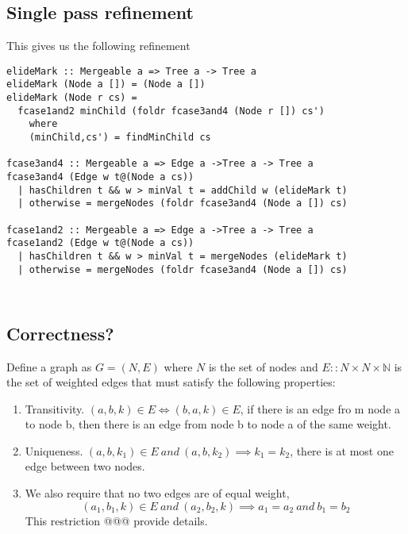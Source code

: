 \documentclass{jfp}
\begin{document}
\subsection{Single pass refinement}


This gives us the following refinement

\begin{verbatim}
elideMark :: Mergeable a => Tree a -> Tree a
elideMark (Node a []) = (Node a [])
elideMark (Node r cs) =
  fcase1and2 minChild (foldr fcase3and4 (Node r []) cs')
    where
    (minChild,cs') = findMinChild cs

fcase3and4 :: Mergeable a => Edge a ->Tree a -> Tree a
fcase3and4 (Edge w t@(Node a cs))
  | hasChildren t && w > minVal t = addChild w (elideMark t)
  | otherwise = mergeNodes (foldr fcase3and4 (Node a []) cs)

fcase1and2 :: Mergeable a => Edge a ->Tree a -> Tree a
fcase1and2 (Edge w t@(Node a cs))
  | hasChildren t && w > minVal t = mergeNodes (elideMark t)
  | otherwise = mergeNodes (foldr fcase3and4 (Node a []) cs)

\end{verbatim}
\begin{verbatim}
\end{verbatim}
\begin{verbatim}
\end{verbatim}


\subsection{Correctness?}

Define a graph as $G = (N,E)$
where $N$ is the set of nodes and $E :: N\times N \times \mathbb{N}$ is the set
of weighted edges
that must satisfy the following properties:
\begin{enumerate}
\item Transitivity. $(a,b,k) \in E  \iff (b,a,k) \in E$, if there is an edge fro
m node a to node b, then there is an edge from node b to node a of the same weight.
\item Uniqueness.   $(a,b,k_1) \in E\ and\ (a,b,k_2) \implies k_1 = k_2$, there
is at most one edge between two nodes.
\item We also require that no two edges are of equal weight,
  \[
  (a_1,b_1,k) \in E\ and\ (a_2,b_2,k) \implies a_1 = a_2\ and\ b_1 =
  b_2
  \]
This restriction @@@ provide details.

\end{enumerate}
\end{document}
